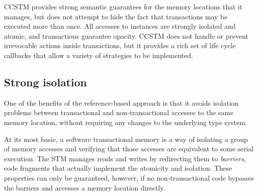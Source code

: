 
CCSTM provides strong semantic guarantees for the memory locations that it
manages, but does not attempt to hide the fact that transactions may be
executed more than once.  All accesses to  instances are strongly
isolated and atomic, and transactions guarantee opacity.  CCSTM does not
handle or prevent irrevocable actions inside transactions, but it provides a
rich set of life cycle callbacks that allow a variety of strategies to be
implemented.

\subsection{Strong isolation}

One of the benefits of the reference-based approach is that it avoids
isolation problems between transactional and non-transactional accesses to
the same memory location, without requiring any changes to the underlying
type system.

At its most basic, a software transactional memory is a way of isolating
a group of memory accesses and verifying that those accesses are
equivalent to some serial execution.  The STM manages reads and writes
by redirecting them to \textit{barriers}, code fragments that actually
implement the atomicity and isolation.  These properties can only be
guaranteed, however, if no non-transactional code bypasses the barriers
and accesses a memory location directly.


